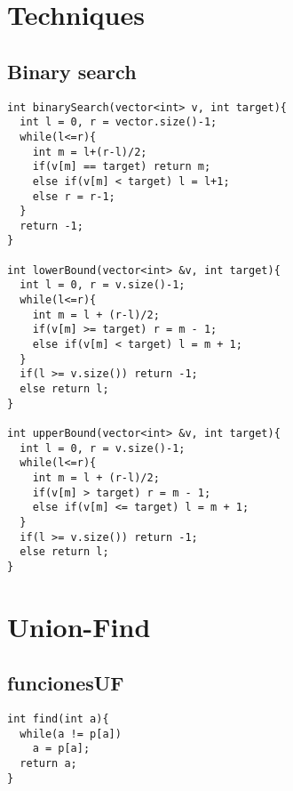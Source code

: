 \documentclass[twoside]{article}
\begin{document}
\begin{multicols*}{2}
{\section*{Techniques}
}
{
\subsection*{Binary search}
}
\begin{verbatim}
int binarySearch(vector<int> v, int target){
  int l = 0, r = vector.size()-1;
  while(l<=r){
    int m = l+(r-l)/2;
    if(v[m] == target) return m;
    else if(v[m] < target) l = l+1;
    else r = r-1;
  }
  return -1;
}

int lowerBound(vector<int> &v, int target){
  int l = 0, r = v.size()-1;
  while(l<=r){
    int m = l + (r-l)/2;
    if(v[m] >= target) r = m - 1;
    else if(v[m] < target) l = m + 1;
  }
  if(l >= v.size()) return -1;
  else return l;
}

int upperBound(vector<int> &v, int target){
  int l = 0, r = v.size()-1;
  while(l<=r){
    int m = l + (r-l)/2;
    if(v[m] > target) r = m - 1;
    else if(v[m] <= target) l = m + 1;
  }
  if(l >= v.size()) return -1;
  else return l;
}

\end{verbatim}

{
[\vspace{2em}]
\section*{Union-Find}
}
{
\subsection*{funcionesUF}
}
\begin{verbatim}
int find(int a){
  while(a != p[a])
    a = p[a];
  return a;
}


\end{verbatim}
\end{multicols*}
\end{document}
